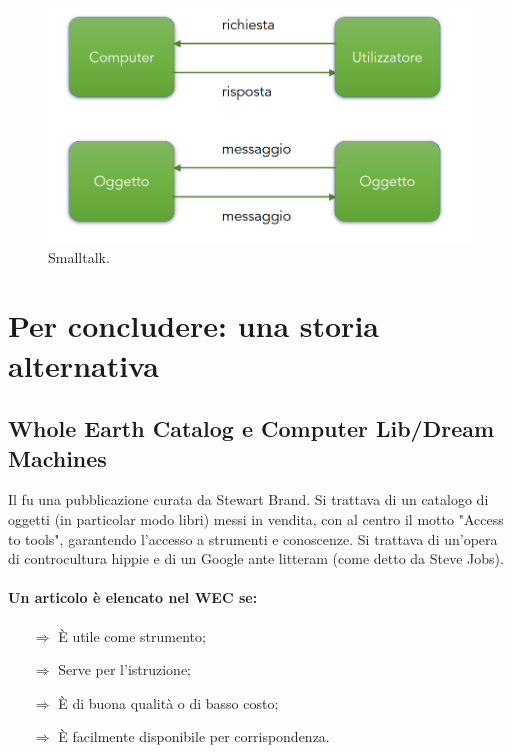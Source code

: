 \begin{figure}[h]
    \centering
    \includegraphics[scale=0.5]{images/Small.png}
    \caption{Smalltalk.}
\end{figure}


\section{Per concludere: una storia alternativa}

\subsection{Whole Earth Catalog e Computer Lib/Dream Machines}

Il  fu una pubblicazione curata da Stewart Brand.
Si trattava di un catalogo di oggetti (in particolar modo libri) messi in vendita, con 
al centro il motto "Access to tools", garantendo l'accesso a strumenti e conoscenze.
Si trattava di un'opera di controcultura hippie e di un Google ante litteram (come detto da Steve Jobs).

\paragraph{Un articolo è elencato nel WEC se:}

\begin{itemize}
    \item [$\Rightarrow$] È utile come strumento;
    \item [$\Rightarrow$] Serve per l'istruzione;
    \item [$\Rightarrow$] È di buona qualità o di basso costo;
    \item [$\Rightarrow$] È facilmente disponibile per corrispondenza.
\end{itemize}


